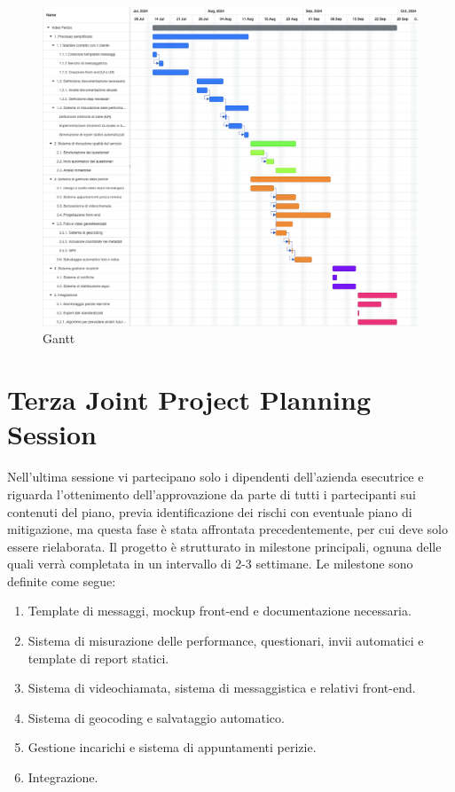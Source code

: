 \documentclass[a4paper,12pt, openright]{report}
\begin{document}
\begin{figure}[htp]
    \centering    \includegraphics[height=1.0\textwidth,width=1.5\textwidth,angle=-90,origin=c]{img/gantt.png}
    \caption{Gantt}
    \label{fig:gantt}
\end{figure}

\section{Terza Joint Project Planning Session}
Nell'ultima sessione vi partecipano solo i dipendenti dell'azienda esecutrice e riguarda l'ottenimento dell'approvazione da parte di tutti i partecipanti sui contenuti del piano, previa identificazione dei rischi con eventuale piano di mitigazione, ma questa fase è stata affrontata precedentemente, per cui deve solo essere rielaborata.
Il progetto è strutturato in milestone principali, ognuna delle quali verrà completata in un intervallo di 2-3 settimane. Le milestone sono definite come segue:
\begin{enumerate}
    \item Template di messaggi, mockup front-end e documentazione necessaria.
    \item Sistema di misurazione delle performance, questionari, invii automatici e template di report statici.
    \item Sistema di videochiamata, sistema di messaggistica e relativi front-end.
    \item Sistema di geocoding e salvataggio automatico.
    \item Gestione incarichi e sistema di appuntamenti perizie.
    \item Integrazione.
\end{enumerate}
\end{document}
